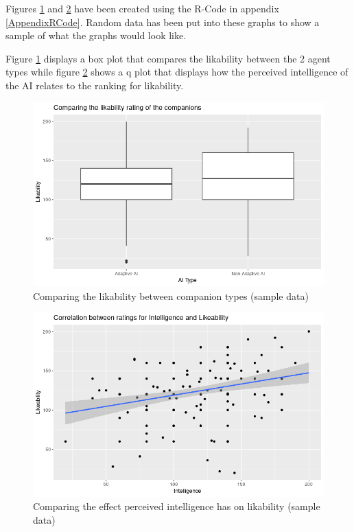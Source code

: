 \documentclass{IEEEtran}
\begin{document}
Figures \ref{fig:LikabilityRplot} and \ref{fig:IntelligenceLikabilityRplot} have been created using the R-Code in appendix \ref{AppendixRCode}. Random data has been put into these graphs to show a sample of what the graphs would look like.

Figure \ref{fig:LikabilityRplot} displays a box plot that compares the likability between the 2 agent types while figure \ref{fig:IntelligenceLikabilityRplot} shows a q plot that displays how the perceived intelligence of the AI relates to the ranking for likability.

\label{AppendixGraphs}
\begin{figure}[h!]
  \centering
  \includegraphics[width=0.9\linewidth]{Images/Sample Graphs/LikabilityRplot.png}
  
\caption{Comparing the likability between companion types (sample data)}
\label{fig:LikabilityRplot}
\end{figure}

\begin{figure}[h!]
  \centering
  \includegraphics[width=0.9\linewidth]{Images/Sample Graphs/IntelligenceLikabilityRplot.png}
  
\caption{Comparing the effect perceived intelligence has on likability (sample data)}
\label{fig:IntelligenceLikabilityRplot}
\end{figure}
\end{document}
